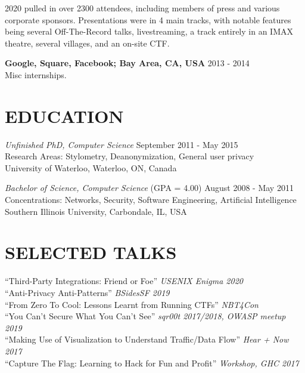 \documentclass[line,margin]{res}
\begin{document}
\begin{resume}
2020 pulled in over 2300 attendees, including members of press and various corporate sponsors. Presentations were in 4 main tracks, with notable features being several Off-The-Record talks, livestreaming, a track entirely in an IMAX theatre, several villages, and an on-site CTF.

{\bf Google, Square, Facebook; Bay Area, CA, USA}  \hfill {2013 - 2014} \\
Misc internships.

\section{EDUCATION} 
{\sl Unfinished PhD, Computer Science} \hfill {September 2011 - May 2015} \\
Research Areas: Stylometry, Deanonymization, General user privacy\\
University of Waterloo, Waterloo, ON, Canada

{\sl Bachelor of Science, Computer Science} (GPA = 4.00) \hfill {August 2008 - May 2011}\\
Concentrations: Networks, Security, Software Engineering, Artificial Intelligence\\
Southern Illinois University, Carbondale, IL, USA

\section{SELECTED TALKS}
``Third-Party Integrations: Friend or Foe'' {\sl USENIX Enigma 2020}\\
``Anti-Privacy Anti-Patterns'' {\sl BSidesSF 2019}\\
``From Zero To Cool: Lessons Learnt from Running CTFs'' {\sl NBT4Con}\\
``You Can't Secure What You Can't See'' {\sl sqr00t 2017/2018, OWASP meetup 2019}\\
``Making Use of Visualization to Understand Traffic/Data Flow'' {\sl Hear + Now 2017}\\
``Capture The Flag: Learning to Hack for Fun and Profit'' {\sl Workshop, GHC 2017}\\

\end{resume}
\end{document}
